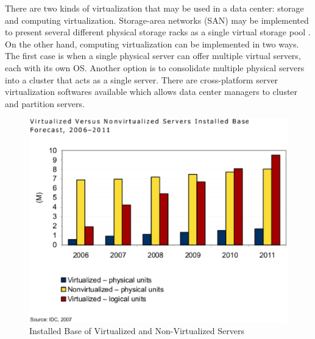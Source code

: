                 There are two kinds of virtualization that may be used in a data center: storage and computing virtualization. Storage-area networks (SAN) may be implemented to present several different physical storage racks as a single virtual storage pool \cite{Antonopoulos05}. On the other hand, computing virtualization can be implemented in two ways. The first case is when a single physical server can offer multiple virtual servers, each with its own OS. Another option is to consolidate multiple physical servers into a cluster that acts as a single server. There are cross-platform server virtualization softwares available which allows data center managers to cluster and partition servers.
                \begin{figure}[h!tb]
                    \centering
                    \includegraphics{graphics/installed_base_virtualized_servers}
                    \caption{Installed Base of Virtualized and Non-Virtualized Servers}
                    \label{fig:installed_base_virtualized_servers}
                \end{figure}
                
